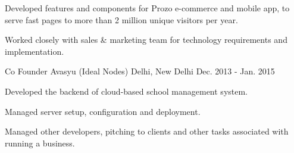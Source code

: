 \begin{cventries}
{\begin{cvitems}
        \item {Developed features and components for Prozo e-commerce and mobile app, to serve fast pages to more than 2 million unique visitors per year.}
        \item {Worked closely with sales \& marketing team for technology requirements and implementation.}
      \end{cvitems}
    }
  \cventry
    {Co Founder}
    {Avasyu (Ideal Nodes)}
    {Delhi, New Delhi}
    {Dec. 2013 - Jan. 2015}
    {
      \begin{cvitems}
        \item {Developed the backend of cloud-based school management system.}
        \item {Managed server setup, configuration and deployment.}
        \item {Managed other developers, pitching to clients and other tasks associated with running a business.}
      \end{cvitems}
    }
\end{cventries}
